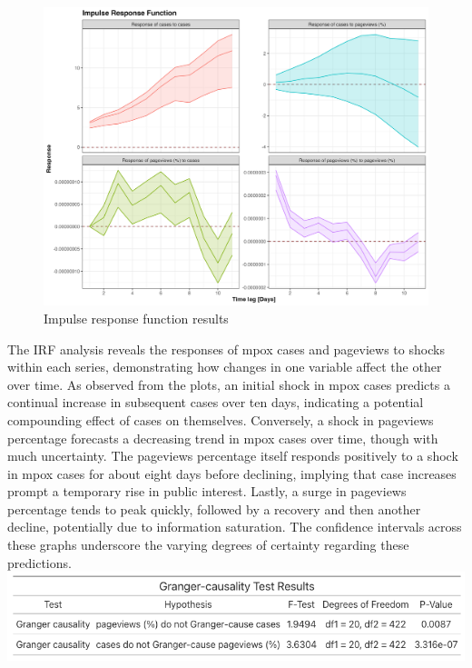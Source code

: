\documentclass[
  12pt,
]{article}
\begin{document}
\begin{figure}[H]

{\centering \includegraphics{images/impulse-response-function.png}

}

\caption{Impulse response function results}

\end{figure}%

The IRF analysis reveals the responses of mpox cases and pageviews to
shocks within each series, demonstrating how changes in one variable
affect the other over time. As observed from the plots, an initial shock
in mpox cases predicts a continual increase in subsequent cases over ten
days, indicating a potential compounding effect of cases on themselves.
Conversely, a shock in pageviews percentage forecasts a decreasing trend
in mpox cases over time, though with much uncertainty. The pageviews
percentage itself responds positively to a shock in mpox cases for about
eight days before declining, implying that case increases prompt a
temporary rise in public interest. Lastly, a surge in pageviews
percentage tends to peak quickly, followed by a recovery and then
another decline, potentially due to information saturation. The
confidence intervals across these graphs underscore the varying degrees
of certainty regarding these
predictions.\includegraphics{images/Bildschirmfoto 2024-04-29 um 22.50.50.png}
\end{document}
